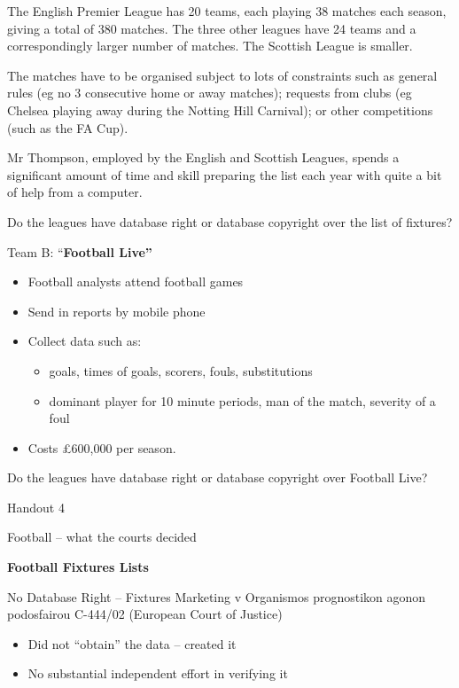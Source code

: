 The English Premier League has 20 teams, each playing 38 matches each
season, giving a total of 380 matches. The three other leagues have 24
teams and a correspondingly larger number of matches. The Scottish
League is smaller.

The matches have to be organised subject to lots of constraints such as
general rules (eg no 3 consecutive home or away matches); requests from
clubs (eg Chelsea playing away during the Notting Hill Carnival); or
other competitions (such as the FA Cup).

Mr Thompson, employed by the English and Scottish Leagues, spends a
significant amount of time and skill preparing the list each year with
quite a bit of help from a computer.

Do the leagues have database right or database copyright over the list
of fixtures?

Team B: ``\textbf{Football Live''}

\begin{itemize}
\item
  Football analysts attend football games
\item
  Send in reports by mobile phone
\item
  Collect data such as:

  \begin{itemize}
  \item
    goals, times of goals, scorers, fouls, substitutions
  \item
    dominant player for 10 minute periods, man of the match, severity of
    a foul
  \end{itemize}
\item
  Costs £600,000 per season.
\end{itemize}

Do the leagues have database right or database copyright over Football
Live?

Handout 4

Football -- what the courts decided

\textbf{Football Fixtures Lists}

No Database Right -- Fixtures Marketing v Organismos prognostikon agonon
podosfairou C-444/02 (European Court of Justice)

\begin{itemize}
\item
  Did not ``obtain'' the data -- created it
\item
  No substantial independent effort in verifying it
\end{itemize}

